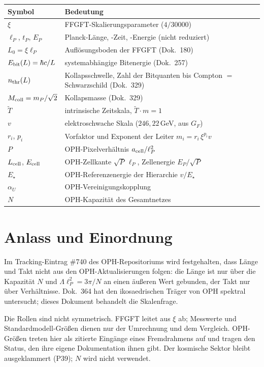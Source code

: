 \medskip
\begin{tabular}{@{}lp{10cm}@{}}
\toprule
\textbf{Symbol} & \textbf{Bedeutung} \\
\midrule
$\xi$ & FFGFT-Skalierungsparameter ($4/30000$) \\
$\ell_P$, $t_P$, $E_P$ & Planck-Länge, -Zeit, -Energie (nicht reduziert) \\
$L_0=\xi\ell_P$ & Auflösungsboden der FFGFT (Dok.~180) \\
$E_{\rm bit}(L)=\hbar c/L$ & systemabhängige Bitenergie (Dok.~257) \\
$n_{\rm thr}(L)$ & Kollapsschwelle, Zahl der Bitquanten bis Compton $=$ Schwarzschild (Dok.~329) \\
$M_{\rm coll}=m_P/\sqrt2$ & Kollapsmasse (Dok.~329) \\
$\tilde T$ & intrinsische Zeitskala, $\tilde T\cdot m=1$ \\
$v$ & elektroschwache Skala ($246{,}22$\,GeV, aus $G_F$) \\
$r_i$, $p_i$ & Vorfaktor und Exponent der Leiter $m_i=r_i\,\xi^{p_i}v$ \\
\midrule
$P$ & OPH-Pixelverhältnis $a_{\rm cell}/\ell_P^2$ \\
$L_{\rm cell}$, $E_{\rm cell}$ & OPH-Zellkante $\sqrt P\,\ell_P$, Zellenergie $E_P/\sqrt P$ \\
$E_\star$ & OPH-Referenzenergie der Hierarchie $v/E_\star$ \\
$\alpha_U$ & OPH-Vereinigungskopplung \\
$N$ & OPH-Kapazität des Gesamtnetzes \\
\bottomrule
\end{tabular}

\section{Anlass und Einordnung}

Im Tracking-Eintrag \#740 des OPH-Repositoriums wird festgehalten, dass Länge
und Takt nicht aus den OPH-Aktualisierungen folgen: die Länge ist nur über die
Kapazität $N$ und $\Lambda\ell_P^2=3\pi/N$ an einen äußeren Wert gebunden, der
Takt nur über Verhältnisse. Dok.~364 hat den ikosaedrischen Träger von OPH
spektral untersucht; dieses Dokument behandelt die Skalenfrage.

Die Rollen sind nicht symmetrisch. FFGFT leitet aus $\xi$ ab; Messwerte und
Standardmodell-Größen dienen nur der Umrechnung und dem Vergleich. OPH-Größen
treten hier als zitierte Eingänge eines Fremdrahmens auf \QM{} und tragen den
Status, den ihre eigene Dokumentation ihnen gibt. Der kosmische Sektor bleibt
ausgeklammert (P39); $N$ wird nicht verwendet.

